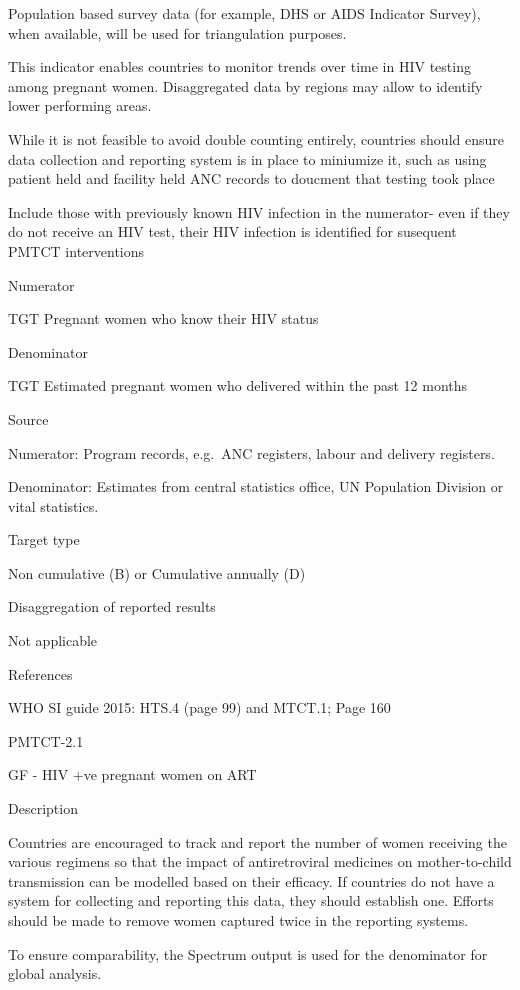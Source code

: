 \documentclass[]{book}
\begin{document}
Population based survey data (for example, DHS or AIDS Indicator Survey), when available, will be used for triangulation purposes.

This indicator enables countries to monitor trends over time in HIV testing among pregnant women. Disaggregated data by regions may allow to identify lower performing areas.

While it is not feasible to avoid double counting entirely, countries should ensure data collection and reporting system is in place to miniumize it, such as using patient held and facility held ANC records to doucment that testing took place

Include those with previously known HIV infection in the numerator- even if they do not receive an HIV test, their HIV infection is identified for susequent PMTCT interventions

Numerator

TGT Pregnant women who know their HIV status

Denominator

TGT Estimated pregnant women who delivered within the past 12 months

Source

Numerator: Program records, e.g.~ANC registers, labour and delivery registers.

Denominator: Estimates from central statistics office, UN Population Division
or vital statistics.

Target type

Non cumulative (B) or Cumulative annually (D)

Disaggregation of reported results

Not applicable

References

WHO SI guide 2015: HTS.4 (page 99) and MTCT.1; Page 160

PMTCT-2.1

GF - HIV +ve pregnant women on ART

Description

Countries are encouraged to track and report the number of women receiving the various regimens so that the impact of antiretroviral medicines on mother-to-child transmission can be modelled based on their efficacy. If countries do not have a system for collecting and reporting this data, they should establish one. Efforts should be made to remove women captured twice in the reporting systems.

To ensure comparability, the Spectrum output is used for the denominator for global analysis.
\end{document}
